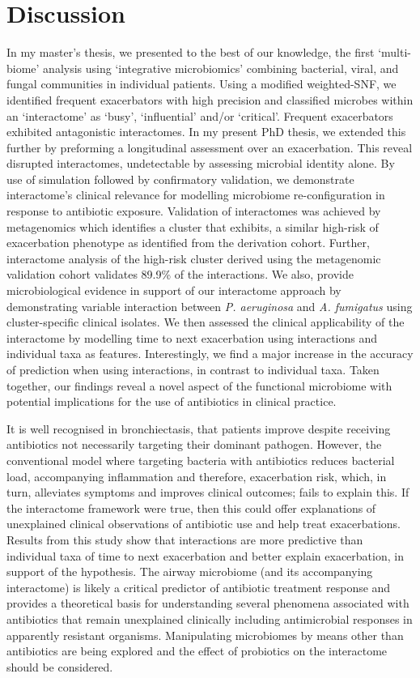 \section{Discussion}
In my master’s thesis, we presented to the best of our knowledge, the first ‘multi-biome’ analysis using ‘integrative microbiomics’ combining bacterial, viral, and fungal communities in individual patients. Using a modified weighted-SNF, we identified frequent exacerbators with high precision and classified microbes within an ‘interactome’ as ‘busy’, ‘influential’ and/or ‘critical’. Frequent exacerbators exhibited antagonistic interactomes. In my present PhD thesis, we extended this further by preforming a longitudinal assessment over an exacerbation. This reveal disrupted interactomes, undetectable by assessing microbial identity alone. By use of simulation followed by confirmatory validation, we demonstrate interactome’s clinical relevance for modelling microbiome re-configuration in response to antibiotic exposure. Validation of interactomes was achieved by metagenomics which identifies a cluster that exhibits, a similar high-risk of exacerbation phenotype as identified from the derivation cohort. Further, interactome analysis of the high-risk cluster derived using the metagenomic validation cohort validates 89.9\% of the interactions. We also, provide microbiological evidence in support of our interactome approach by demonstrating variable interaction between \emph{P. aeruginosa} and \emph{A. fumigatus} using cluster-specific clinical isolates. We then assessed the clinical applicability of the interactome by modelling time to next exacerbation using interactions and individual taxa as features. Interestingly, we find a major increase in the accuracy of prediction when using interactions, in contrast to individual taxa. Taken together, our findings reveal a novel aspect of the functional microbiome with potential implications for the use of antibiotics in clinical practice.

It is well recognised in bronchiectasis, that patients improve despite receiving antibiotics not necessarily targeting their dominant pathogen. However, the conventional model where targeting bacteria with antibiotics reduces bacterial load, accompanying inflammation and therefore, exacerbation risk, which, in turn, alleviates symptoms and improves clinical outcomes; fails to explain this. If the interactome framework were true, then this could offer explanations of unexplained clinical observations of antibiotic use and help treat exacerbations. Results from this study show that interactions are more predictive than individual taxa of time to next exacerbation and better explain exacerbation, in support of the hypothesis. The airway microbiome (and its accompanying interactome) is likely a critical predictor of antibiotic treatment response and provides a theoretical basis for understanding several phenomena associated with antibiotics that remain unexplained clinically including antimicrobial responses in apparently resistant organisms. Manipulating microbiomes by means other than antibiotics are being explored and the effect of probiotics on the interactome should be considered.

